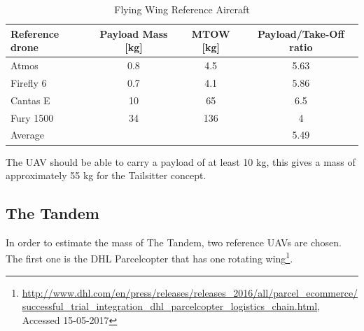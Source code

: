 \begin{table}[htb]
    \centering
    \caption{Flying Wing Reference Aircraft}
    \label{tab:flyingwing}
    \begin{tabularx}{\textwidth}{lccc}
        \toprule
        \textbf{Reference drone}    & \textbf{Payload Mass [kg]}     & \textbf{MTOW [kg]}      & \textbf{Payload/Take-Off ratio}          \\\midrule
        Atmos                       & 0.8                            & 4.5                     & 5.63  \\\hdashline
        Firefly 6                   & 0.7                            & 4.1                     & 5.86 \\\hdashline
        Cantas E                    & 10                             & 65                      & 6.5     \\\hdashline             
        Fury 1500                   & 34                             & 136                     & 4 \\\midrule
        Average                     &                                &                         & 5.49 \\\bottomrule
    \end{tabularx}
\end{table}

The UAV should be able to carry a payload of at least 10 kg, this gives a mass of approximately 55 kg for the Tailsitter concept. 

\subsection{The Tandem}

 In order to estimate the mass of The Tandem, two reference UAVs are chosen. The first one is the DHL Parcelcopter that has one rotating wing\footnote{\url{http://www.dhl.com/en/press/releases/releases_2016/all/parcel_ecommerce/successful_trial_integration_dhl_parcelcopter_logistics_chain.html}, Accessed 15-05-2017}. 
 

